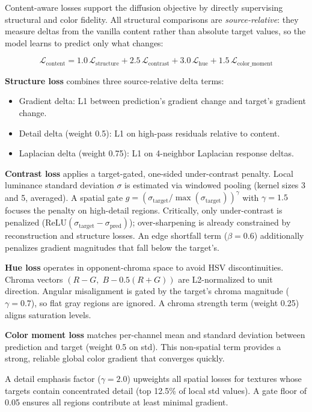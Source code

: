 Content-aware losses support the diffusion objective by directly supervising structural and color fidelity. All structural comparisons are \emph{source-relative}: they measure deltas from the vanilla content rather than absolute target values, so the model learns to predict only what changes:

\begin{equation}
    \mathcal{L}_{\text{content}} = 1.0\,\mathcal{L}_{\text{structure}} + 2.5\,\mathcal{L}_{\text{contrast}} + 3.0\,\mathcal{L}_{\text{hue}} + 1.5\,\mathcal{L}_{\text{color\_moment}}
\end{equation}

\textbf{Structure loss} combines three source-relative delta terms:
\begin{itemize}
    \item Gradient delta: L1 between prediction's gradient change and target's gradient change.
    \item Detail delta (weight 0.5): L1 on high-pass residuals relative to content.
    \item Laplacian delta (weight 0.75): L1 on 4-neighbor Laplacian response deltas.
\end{itemize}

\textbf{Contrast loss} applies a target-gated, one-sided under-contrast penalty. Local luminance standard deviation $\sigma$ is estimated via windowed pooling (kernel sizes 3 and 5, averaged). A spatial gate $g = (\sigma_{\text{target}} / \max(\sigma_{\text{target}}))^\gamma$ with $\gamma=1.5$ focuses the penalty on high-detail regions. Critically, only under-contrast is penalized ($\text{ReLU}(\sigma_{\text{target}} - \sigma_{\text{pred}})$); over-sharpening is already constrained by reconstruction and structure losses. An edge shortfall term ($\beta=0.6$) additionally penalizes gradient magnitudes that fall below the target's.

\textbf{Hue loss} operates in opponent-chroma space to avoid HSV discontinuities. Chroma vectors $(R-G,\; B - 0.5(R+G))$ are L2-normalized to unit direction. Angular misalignment is gated by the target's chroma magnitude ($\gamma=0.7$), so flat gray regions are ignored. A chroma strength term (weight 0.25) aligns saturation levels.

\textbf{Color moment loss} matches per-channel mean and standard deviation between prediction and target (weight 0.5 on std). This non-spatial term provides a strong, reliable global color gradient that converges quickly.

A detail emphasis factor ($\gamma=2.0$) upweights all spatial losses for textures whose targets contain concentrated detail (top 12.5\% of local std values). A gate floor of 0.05 ensures all regions contribute at least minimal gradient.

